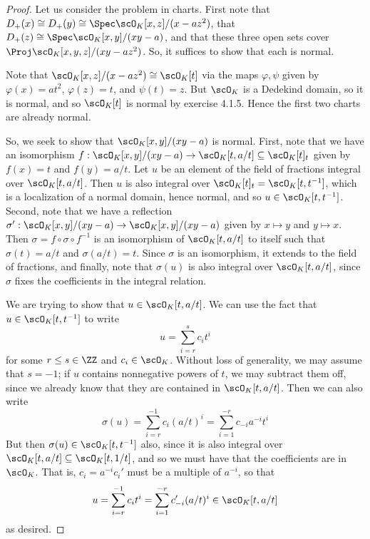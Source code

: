 \begin{proof}
	Let us consider the problem in charts. First note that $D_{+}(x) \cong D_{+}(y) \cong \Spec\scO_K[x,z]/(x-az^2)$, that $D_{+}(z) \cong \Spec\scO_K[x,y]/(xy-a)$, and that these three open sets cover $\Proj\scO_K[x,y,z]/(xy-az^2)$. So, it suffices to show that each is normal.
	
	Note that $\scO_K[x,z]/(x-az^2) \cong \scO_K[t]$ via the maps $\varphi,\psi$ given by $\varphi(x) = at^2$, $\varphi(z) = t$, and $\psi(t) = z$. But $\scO_K$ is a Dedekind domain, so it is normal, and so $\scO_K[t]$ is normal by exercise 4.1.5. Hence the first two charts are already normal.
	
	So, we seek to show that $\scO_K[x,y]/(xy-a)$ is normal. First, note that we have an isomorphism $f : \scO_K[x,y]/(xy-a) \to \scO_K[t,a/t] \subseteq \scO_K[t]_t$ given by $f(x) = t$ and $f(y) = a/t$. Let $u$ be an element of the field of fractions integral over $\scO_K[t,a/t]$. Then $u$ is also integral over $\scO_K[t]_t = \scO_K[t,t^{-1}]$, which is a localization of a normal domain, hence normal, and so $u \in \scO_K[t,t^{-1}]$. Second, note that we have a reflection $\sigma' : \scO_K[x,y]/(xy-a) \to \scO_K[x,y]/(xy-a)$ given by $x \mapsto y$ and $y \mapsto x$. Then $\sigma = f \circ \sigma \circ f^{-1}$ is an isomorphism of $\scO_K[t,a/t]$ to itself such that $\sigma(t) = a/t$ and $\sigma(a/t) = t$. Since $\sigma$ is an isomorphism, it extends to the field of fractions, and finally, note that $\sigma(u)$ is also integral over $\scO_K[t,a/t]$, since $\sigma$ fixes the coefficients in the integral relation.
	
	We are trying to show that $u \in \scO_K[t,a/t]$. We can use the fact that $u \in \scO_K[t,t^{-1}]$ to write
	\[ u = \sum_{i=r}^s c_it^i \]
	for some $r \leq s \in \ZZ$ and $c_i \in \scO_K$. Without loss of generality, we may assume that $s = -1$; if $u$ contains nonnegative powers of $t$, we may subtract them off, since we already know that they are contained in $\scO_K[t,a/t]$. Then we can also write
	\[ \sigma(u) = \sum_{i=r}^{-1} c_i(a/t)^i = \sum_{i=1}^{-r} c_{-i}a^{-i}t^i \]
	But then $\sigma(u) \in \scO_K[t,t^{-1}]$ also, since it is also integral over $\scO_K[t,a/t] \subseteq \scO_K[t,1/t]$, and so we must have that the coefficients are in $\scO_K$. That is, $c_i = a^{-i}c_i'$ must be a multiple of $a^{-i}$, so that
	\[ u = \sum_{i=r}^{-1} c_it^i = \sum_{i=1}^{-r} c_{-i}'(a/t)^i \in \scO_K[t,a/t] \]
	as desired.
\end{proof}
